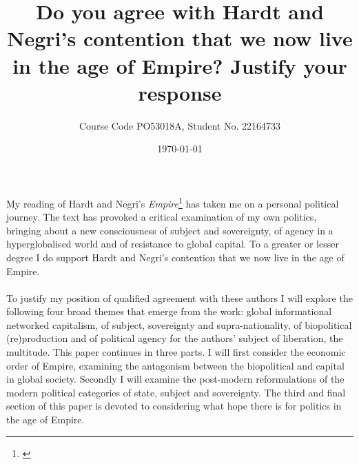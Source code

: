 \documentclass[12pt,a4paper,titlepage]{article}
\title{Do you agree with Hardt and Negri's contention that we now live in the age of Empire? Justify your response}
\author{Course Code PO53018A, Student No. 22164733}
\date{\today}
\begin{document}

\maketitle
\doublespacing
\paragraph{}My reading of Hardt and Negri's \textit{Empire}\footnote{\cite{Hardt:2001jl}} has taken me on a personal political journey. The text has provoked a critical examination of my own politics, bringing about a new consciousness of subject and sovereignty, of agency in a hyperglobalised world and of resistance to global capital. To a greater or lesser degree I do support Hardt and Negri's contention that we now live in the age of Empire.

\paragraph{}To justify my position of qualified agreement with these authors I will explore the following four broad themes that emerge from the work: global informational networked capitalism, of subject, sovereignty and supra-nationality, of biopolitical (re)production and of political agency for the authors' subject of liberation, the multitude. This paper continues in three parts. I will first consider the economic order of Empire, examining the antagonism between the biopolitical and capital in global society. Secondly I will examine the post-modern reformulations of the modern political categories of state, subject and sovereignty. The third and final section of this paper is devoted to considering what hope there is for politics in the age of Empire.
\end{document}
